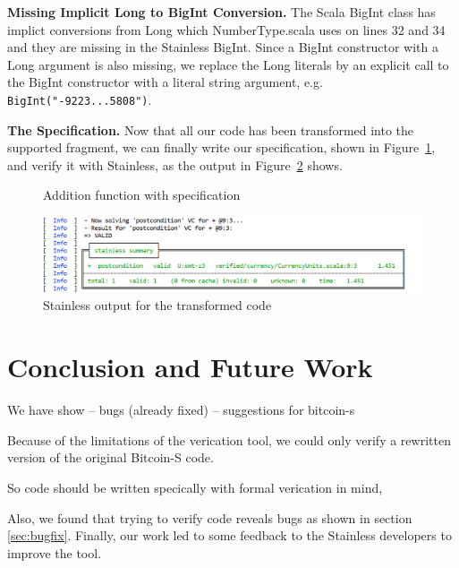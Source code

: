 \documentclass[runningheads]{llncs}
\renewcommand{\paragraph}{\textbf}%
\begin{document}
\paragraph{Missing Implicit Long to BigInt Conversion.} The Scala
BigInt class has implict conversions from Long which NumberType.scala
uses on lines 32 and 34 and they are missing in the Stainless
BigInt. Since a BigInt constructor with a Long argument is also
missing, we replace the Long literals by an explicit call to the
BigInt constructor with a literal string argument,
e.g. \texttt{BigInt("-9223...5808")}.


\paragraph{The Specification.} Now that all our code has been
transformed into the supported fragment, we can finally write our
specification, shown in Figure~\ref{fig:spec}, and verify it with
Stainless, as the output in Figure~\ref{fig:result} shows.

\begin{figure}

\caption{Addition function with specification}
\label{fig:spec}
\end{figure}

\begin{figure}
	\centering
		\includegraphics[width=\textwidth]{result_output}
	\caption{Stainless output for the transformed code}
  \label{fig:result}
\end{figure}


\section{Conclusion and Future Work}

We have show
-- bugs (already fixed)
-- suggestions for bitcoin-s

Because of the limitations of the verication tool, we could only
verify a rewritten version of the original Bitcoin-S code.

So code should be written specically with formal verication in mind,

Also, we found that trying to verify code reveals bugs as shown in
section \ref{sec:bugfix}.  Finally, our work led to some feedback to
the Stainless developers to improve the tool.






\clearpage
\appendix
\end{document}
